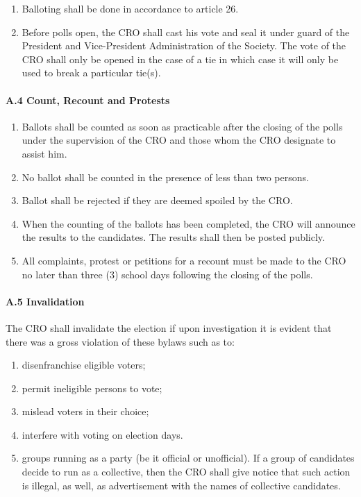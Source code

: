 \begin{enumerate}
\def\labelenumi{\arabic{enumi}.}
\setcounter{enumi}{1}
\item
  Balloting shall be done in accordance to article 26.
\item
  Before polls open, the CRO shall cast his vote and seal it under guard
  of the President and Vice-President Administration of the Society. The
  vote of the CRO shall only be opened in the case of a tie in which
  case it will only be used to break a particular tie(s).
\end{enumerate}

\paragraph{A.4 Count, Recount and
Protests}\label{a.4-count-recount-and-protests}

\begin{enumerate}
\def\labelenumi{\arabic{enumi}.}
\item
  Ballots shall be counted as soon as practicable after the closing of
  the polls under the supervision of the CRO and those whom the CRO
  designate to assist him.
\item
  No ballot shall be counted in the presence of less than two persons.
\item
  Ballot shall be rejected if they are deemed spoiled by the CRO.
\item
  When the counting of the ballots has been completed, the CRO will
  announce the results to the candidates. The results shall then be
  posted publicly.
\item
  All complaints, protest or petitions for a recount must be made to the
  CRO no later than three (3) school days following the closing of the
  polls.
\end{enumerate}

\paragraph{A.5 Invalidation}\label{a.5-invalidation}

The CRO shall invalidate the election if upon investigation it is
evident that there was a gross violation of these bylaws such as to:

\begin{enumerate}
\def\labelenumi{\arabic{enumi}.}
\item
  disenfranchise eligible voters;
\item
  permit ineligible persons to vote;
\item
  mislead voters in their choice;
\item
  interfere with voting on election days.
\item
  groups running as a party (be it official or unofficial). If a group
  of candidates decide to run as a collective, then the CRO shall give
  notice that such action is illegal, as well, as advertisement with the
  names of collective candidates.
\end{enumerate}

